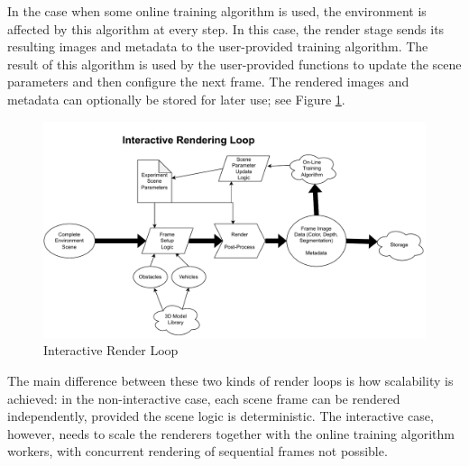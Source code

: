 In the case when some online training algorithm is used, the environment is affected by this algorithm at every step. In this case, the render  stage sends its resulting images and metadata to the user-provided training algorithm. The result of this algorithm is used by the user-provided functions to update the scene parameters and then configure the next frame. The rendered images and metadata can optionally be stored for later use; see Figure \ref{fig:design-render-interactive}.

\begin{figure}[h]
    \centering
    \includegraphics[width=14.5cm]{src/img/fig/fig-5 interactive render loop.drawio.pdf}
    \caption{Interactive Render Loop}
    \label{fig:design-render-interactive}
\end{figure}

The main difference between these two kinds of render loops is how scalability is achieved: in the non-interactive case, each scene frame can be rendered independently, provided the scene logic is deterministic. The interactive case, however, needs to scale the renderers together with the online training algorithm workers, with concurrent rendering of sequential frames not possible.